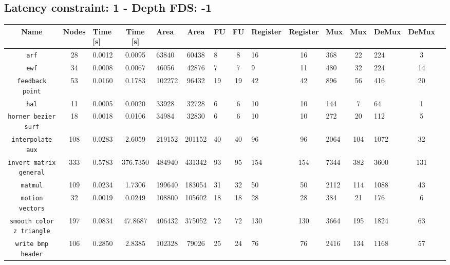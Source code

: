 \documentclass[a4paper, 11pt, oneside]{article}
\begin{document}
\begin{landscape}
\clearpage
\subsection{Latency constraint: 1 - Depth FDS: -1}
\begin{table}[!h]
  \begin{center}
  \begin{tabular}{|c|c V{3} c|g|c|g|c|g|c|g|c|g|c|g|}
    \hline
    \textbf{Name} & \textbf{Nodes} & \textbf{Time [s]} & \textbf{Time [s]} & \textbf{Area} & \textbf{Area} & \textbf{FU} & \textbf{FU} & \textbf{Register} & \textbf{Register} & \textbf{Mux} & \textbf{Mux}
    & \textbf{DeMux} & \textbf{DeMux}\\
    \hline
    \texttt{arf}										  &  28 & 0.0012 &   0.0095 &  63840 &  60438 &  8 &  8 &  16 &  16 &  368 &  22 &  224 & 3 \\ \hline
    \texttt{ewf}										  &  34 & 0.0008 &   0.0067 &  46056 &  42876 &  7 &  7 &   9 &  11 &  480 &  32 &  224 & 14 \\ \hline
    \texttt{feedback point}					  &  53 & 0.0160 &   0.1783 & 102272 &  96432 & 19 & 19 &  42 &  42 &  896 &  56 &  416 & 20 \\ \hline
    \texttt{hal}										  &  11 & 0.0005 &   0.0020 &  33928 &  32728 &  6 &  6 &  10 &  10 &  144 &   7 &   64 & 1 \\ \hline
    \texttt{horner bezier surf}			  &  18 & 0.0018 &   0.0106 &  34984 &  32830 &  6 &  6 &  10 &  10 &  272 &  20 &  112 & 5 \\ \hline
    \texttt{interpolate aux}				  & 108 & 0.0283 &   2.6059 & 219152 & 201152 & 40 & 40 &  96 &  96 & 2064 & 104 & 1072 & 32 \\ \hline
    \texttt{invert matrix general}	  & 333 & 0.5783 & 376.7350 & 484940 & 431342 & 93 & 95 & 154 & 154 & 7344 & 382 & 3600 & 131 \\ \hline
    \texttt{matmul}									  & 109 & 0.0234 &   1.7306 & 199640 & 183054 & 31 & 32 &  50 &  50 & 2112 & 114 & 1088 & 43 \\ \hline
    \texttt{motion vectors}					  &  32 & 0.0019 &   0.0249 & 108800 & 105602 & 18 & 18 &  28 &  28 &  384 &  21 &  176 & 6 \\ \hline
    \texttt{smooth color z triangle}	& 197 & 0.0834 &  47.8687 & 406432 & 375052 & 72 & 72 & 130 & 130 & 3664 & 195 & 1824 & 63 \\ \hline
    \texttt{write bmp header}				  & 106 & 0.2850 &   2.8385 & 102328 &  79026 & 25 & 24 &  76 &  76 & 2416 & 134 & 1168 & 57 \\ \hline
  \end{tabular}
  \end{center}
\end{table}


\end{landscape}
\end{document}
